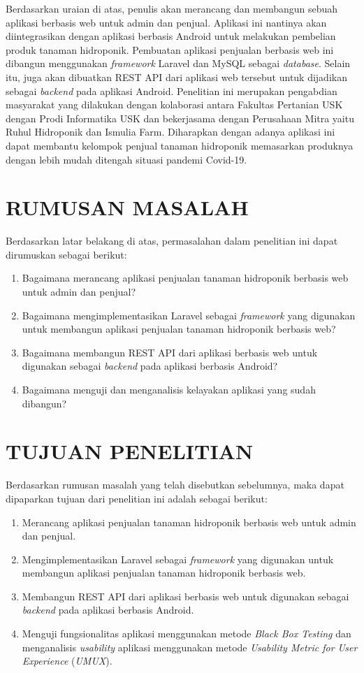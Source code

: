 \par Berdasarkan uraian di atas, penulis akan merancang dan membangun sebuah aplikasi berbasis web untuk admin dan penjual. Aplikasi ini nantinya akan diintegrasikan dengan aplikasi berbasis Android untuk melakukan pembelian produk tanaman hidroponik. Pembuatan aplikasi penjualan berbasis web ini dibangun menggunakan \textit{framework} Laravel dan MySQL sebagai \textit{database}. Selain itu, juga akan dibuatkan REST API dari aplikasi web tersebut untuk dijadikan sebagai \textit{backend} pada aplikasi Android. Penelitian ini merupakan pengabdian masyarakat yang dilakukan dengan kolaborasi antara Fakultas Pertanian USK dengan Prodi Informatika USK dan bekerjasama dengan Perusahaan Mitra yaitu Ruhul Hidroponik dan Ismulia Farm. Diharapkan dengan adanya aplikasi ini dapat membantu kelompok penjual tanaman hidroponik memasarkan produknya dengan lebih mudah ditengah situasi pandemi Covid-19.

\fancyhf{} 
\fancyfoot[R]{\thepage}

\section{\uppercase{RUMUSAN MASALAH}}
Berdasarkan latar belakang di atas, permasalahan dalam penelitian ini dapat dirumuskan sebagai berikut:
\begin{enumerate}
	\item Bagaimana merancang aplikasi penjualan tanaman hidroponik berbasis web untuk admin dan penjual?
	\item Bagaimana mengimplementasikan Laravel sebagai \textit{framework} yang digunakan untuk membangun aplikasi penjualan tanaman hidroponik berbasis web?
	\item Bagaimana membangun REST API dari aplikasi berbasis web untuk digunakan sebagai \textit{backend}  pada aplikasi berbasis Android?
	\item Bagaimana menguji dan menganalisis kelayakan aplikasi yang sudah dibangun?
\end{enumerate}

\section{\uppercase{TUJUAN PENELITIAN}}
Berdasarkan rumusan masalah yang telah disebutkan sebelumnya, maka dapat dipaparkan tujuan dari penelitian ini adalah sebagai berikut:
\begin{enumerate}
	\item Merancang aplikasi penjualan tanaman hidroponik berbasis web untuk admin dan penjual.
	\item Mengimplementasikan Laravel sebagai \textit{framework} yang digunakan untuk membangun aplikasi penjualan tanaman hidroponik berbasis web.
	\item Membangun REST API dari aplikasi berbasis web untuk digunakan sebagai \textit{backend} pada aplikasi berbasis Android.
	\item  Menguji fungsionalitas aplikasi menggunakan metode \textit{Black Box Testing} dan menganalisis \textit{usability} aplikasi menggunakan metode \textit{Usability Metric for User Experience} (\textit{UMUX}).
\end{enumerate}



